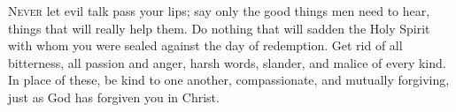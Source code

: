
\lettrine{N}{ever} let evil talk pass your lips; say only the good things men need to hear, things that will really help them. Do nothing that will sadden the Holy Spirit with whom you were sealed against the day of redemption. Get rid of all bitterness, all passion and anger, harsh words, slander, and malice of every kind. In place of these, be kind to one another, compassionate, and mutually forgiving, just as God has forgiven you in Christ.